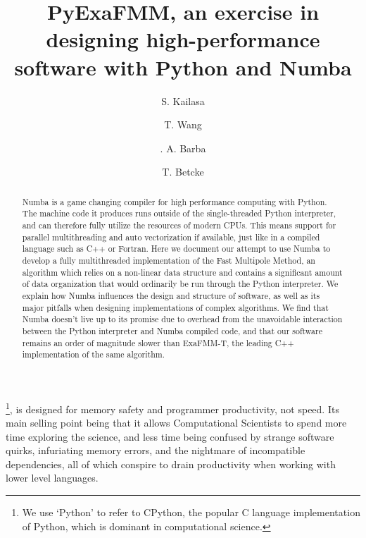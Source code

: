 \documentclass{IEEEcsmag}
\begin{document}

\title{PyExaFMM, an exercise in designing high-performance software with Python and Numba}

\author{S. Kailasa}

\author{T. Wang}

\author{. A. Barba}

\author{T. Betcke}


\begin{abstract}
    Numba is a game changing compiler for high performance computing with Python. The machine code it produces runs outside of the single-threaded Python interpreter, and can therefore fully utilize the resources of modern CPUs. This means support for parallel multithreading and auto vectorization if available, just like in a compiled language such as C++ or Fortran. Here we document our attempt to use Numba to develop a fully multithreaded implementation of the Fast Multipole Method, an algorithm which relies on a non-linear data structure and contains a significant amount of data organization that would ordinarily be run through the Python interpreter. We explain how Numba influences the design and structure of software, as well as its major pitfalls when designing implementations of complex algorithms. We find that Numba doesn't live up to its promise due to overhead from the unavoidable interaction between the Python interpreter and Numba compiled code, and that our software remains an order of magnitude slower than ExaFMM-T, the leading C++ implementation of the same algorithm.
\end{abstract}

\maketitle
{}\footnote{We use `Python' to refer to CPython, the popular C language implementation of Python, which is dominant in computational science.}, is designed for memory safety and programmer productivity, not speed. Its main selling point being that it allows Computational Scientists to spend more time exploring the science, and less time being confused by strange software quirks, infuriating memory errors, and the nightmare of incompatible dependencies, all of which conspire to drain productivity when working with lower level languages.
\end{document}
